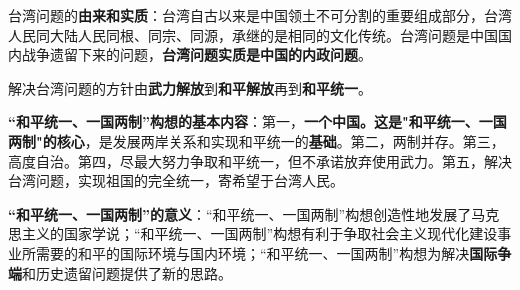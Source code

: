 {台湾问题的}\textbf{{由来和实质}}{：台湾自古以来是中国领土不可分割的重要组成部分，台湾人民同大陆人民同根、同宗、同源，承继的是相同的文化传统。台湾问题是中国国内战争遗留下来的问题，}\textbf{{台湾问题实质是中国的内政问题}}{。}

解决台湾问题的方针由\textbf{{武力解放}}到\textbf{{和平解放}}再到\textbf{{和平统一}}。

\textbf{{``和平统一、一国两制''构想的基本内容}}：第一，\textbf{{一个中国。这是"}{和平统一、一国两制"}{的核心}}，是发展两岸关系和实现和平统一的\textbf{{基础}}。第二，两制并存。第三，高度自治。第四，尽最大努力争取和平统一，但不承诺放弃使用武力。第五，解决台湾问题，实现祖国的完全统一，寄希望于台湾人民。

\textbf{{``和平统一、一国两制''的意义}}{：}{``和平统一、一国两制''构想创造性地发展了马克思主义的国家学说}{；}{``和平统一、一国两制''构想有利于争取社会主义现代化建设事业所需要的和平的国际环境与国内环境}{；}{``和平统一、一国两制''构想为解决\textbf{{国际争端}}和历史遗留问题提供了新的思路}{。}
